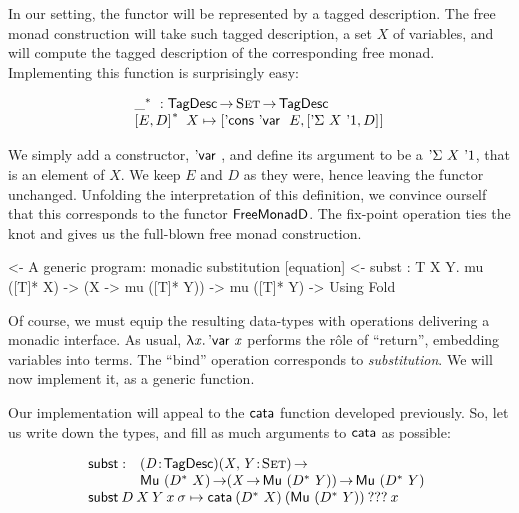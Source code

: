 In our setting, the functor will be represented by a tagged
description. The free monad construction will take such tagged
description, a set $X$ of variables, and will compute the tagged
description of the corresponding free monad. Implementing this
function is surprisingly easy:

\[\stk{
\FreeMonad{\_} : \TagDesc \To \Set \To \TagDesc \\
\FreeMonad{\pair{E}{D}{}}\:X \mapsto
    \pair{\ListCons{\DVar{}}{E}}
         {\pair{\DSigma{X}{\DUnit}}{D}{}}{}
}\]

We simply add a constructor, $\DVar{}$, and define its argument to be
a $\DSigma{X}{\DUnit}$, that is an element of $X$. We keep $E$ and $D$
as they were, hence leaving the functor unchanged. Unfolding the
interpretation of this definition, we convince ourself that this
corresponds to the functor $\FMFreeMonadD$. The fix-point operation
ties the knot and gives us the full-blown free monad construction.

\begin{wstructure}
<- A generic program: monadic substitution [equation]
    <- subst : \forall T X Y. mu ([T]* X) -> (X -> mu ([T]* Y)) -> mu ([T]* Y)
        -> Using Fold
\end{wstructure}

Of course, we must equip the resulting data-types with operations
delivering a monadic interface. As usual, \(\LAM{\x}\DVar{\x}\)
performs the r\^ole of ``return'', embedding variables into terms. The
``bind'' operation corresponds to \emph{substitution}. We will now
implement it, as a generic function.

Our implementation will appeal to the $\cata$ function developed
previously. So, let us write down the types, and fill as much
arguments to $\cata$ as possible:

\newcommand{\subst}{\F{subst}}
\newcommand{\apply}{\F{apply}}


\[\stk{
\begin{array}{@{}ll}
\subst : & \PITEL{\V{D}}{\TagDesc}
           \PI{\V{X}, \V{Y}}{\Set} \\
         & \Mu{(\FreeMonad{D}{X})} \To
           (\V{X} \To \Mu{(\FreeMonad{D}{Y})}) \To
           \Mu{(\FreeMonad{D}{Y})} 
\end{array} \\
\subst\: D\: X\: Y\: x\: \sigma \mapsto
  \cata\: (\FreeMonad{D}{X})\: (\Mu{(\FreeMonad{D}{Y})})\: ???\: x
}\]


